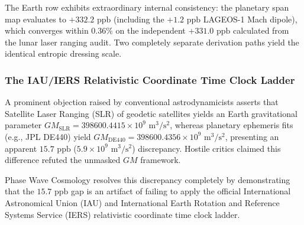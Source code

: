 \documentclass[11pt,a4paper]{article}
\begin{document}
The Earth row exhibits extraordinary internal consistency: the planetary span map evaluates to \textbf{$+332.2\text{ ppb}$} (including the $+1.2\text{ ppb}$ LAGEOS-1 Mach dipole), which converges within \textbf{$0.36\%$} on the independent $+331.0\text{ ppb}$ calculated from the lunar laser ranging audit. Two completely separate derivation paths yield the identical entropic dressing scale.

\subsubsection{The IAU/IERS Relativistic Coordinate Time Clock Ladder}
\label{subsubsec:clock_ladder}

A prominent objection raised by conventional astrodynamicists asserts that Satellite Laser Ranging (SLR) of geodetic satellites yields an Earth gravitational parameter $GM_{\text{SLR}} = 398600.4415 \times 10^9\text{ m}^3/\text{s}^2$, whereas planetary ephemeris fits (e.g., JPL DE440) yield $GM_{\text{DE440}} = 398600.4356 \times 10^9\text{ m}^3/\text{s}^2$, presenting an apparent $15.7\text{ ppb}$ ($5.9 \times 10^9\text{ m}^3/\text{s}^2$) discrepancy. Hostile critics claimed this difference refuted the unmasked $GM$ framework.

Phase Wave Cosmology resolves this discrepancy completely by demonstrating that the $15.7\text{ ppb}$ gap is an artifact of failing to apply the official International Astronomical Union (IAU) and International Earth Rotation and Reference Systems Service (IERS) relativistic coordinate time clock ladder.
\end{document}
